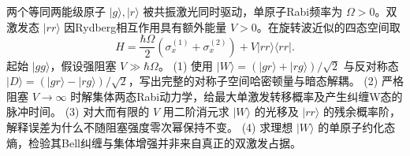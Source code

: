 两个等同两能级原子 \(|g\rangle,|r\rangle\) 被共振激光同时驱动，单原子Rabi频率为 \(\Omega>0\)。双激发态 \(|rr\rangle\) 因Rydberg相互作用具有额外能量 \(V>0\)。在旋转波近似的四态空间取
\[
H=\frac{\hbar\Omega}{2}(\sigma_x^{(1)}+\sigma_x^{(2)})+V|rr\rangle\langle rr|.
\]
起始 \(|gg\rangle\)，假设强阻塞 \(V\gg\hbar\Omega\)。
(1) 使用 \(|W\rangle=(|gr\rangle+|rg\rangle)/\sqrt2\) 与反对称态 \(|D\rangle=(|gr\rangle-|rg\rangle)/\sqrt2\)，写出完整的对称子空间哈密顿量与暗态解耦。
(2) 严格阻塞 \(V\to\infty\) 时解集体两态Rabi动力学，给最大单激发转移概率及产生纠缠W态的脉冲时间。
(3) 对大而有限的 \(V\) 用二阶消元求 \(|W\rangle\) 的光移及 \(|rr\rangle\) 的残余概率阶，解释误差为什么不随阻塞强度零次幂保持不变。
(4) 求理想 \(|W\rangle\) 的单原子约化态熵，检验其Bell纠缠与集体增强并非来自真正的双激发占据。
